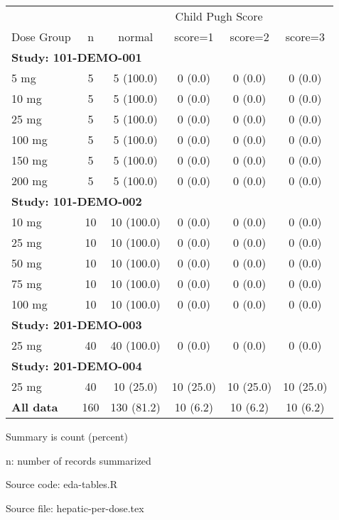 \setlength{\tabcolsep}{5pt} 
\begin{threeparttable}
\renewcommand{\arraystretch}{1.3}
\begin{tabular}[h]{lccccc}
\hline
\multicolumn{2}{c}{} & \multicolumn{4}{c}{Child Pugh Score} \\
\cmidrule(lr){3-6}
Dose Group & n & normal & score=1 & score=2 & score=3 \\
\hline
\multicolumn{6}{l}{\textbf{Study: 101-DEMO-001}}\\%
5 mg & 5 & 5 (100.0) & 0 (0.0) & 0 (0.0) & 0 (0.0) \\
10 mg & 5 & 5 (100.0) & 0 (0.0) & 0 (0.0) & 0 (0.0) \\
25 mg & 5 & 5 (100.0) & 0 (0.0) & 0 (0.0) & 0 (0.0) \\
100 mg & 5 & 5 (100.0) & 0 (0.0) & 0 (0.0) & 0 (0.0) \\
150 mg & 5 & 5 (100.0) & 0 (0.0) & 0 (0.0) & 0 (0.0) \\
200 mg & 5 & 5 (100.0) & 0 (0.0) & 0 (0.0) & 0 (0.0) \\
\hline \multicolumn{6}{l}{\textbf{Study: 101-DEMO-002}}\\%
10 mg & 10 & 10 (100.0) & 0 (0.0) & 0 (0.0) & 0 (0.0) \\
25 mg & 10 & 10 (100.0) & 0 (0.0) & 0 (0.0) & 0 (0.0) \\
50 mg & 10 & 10 (100.0) & 0 (0.0) & 0 (0.0) & 0 (0.0) \\
75 mg & 10 & 10 (100.0) & 0 (0.0) & 0 (0.0) & 0 (0.0) \\
100 mg & 10 & 10 (100.0) & 0 (0.0) & 0 (0.0) & 0 (0.0) \\
\hline \multicolumn{6}{l}{\textbf{Study: 201-DEMO-003}}\\%
25 mg & 40 & 40 (100.0) & 0 (0.0) & 0 (0.0) & 0 (0.0) \\
\hline \multicolumn{6}{l}{\textbf{Study: 201-DEMO-004}}\\%
25 mg & 40 & 10 (25.0) & 10 (25.0) & 10 (25.0) & 10 (25.0) \\
\hline \hline {\bf All data} & 160 & 130 (81.2) & 10 (6.2) & 10 (6.2) & 10 (6.2) \\
\hline
\end{tabular}
\begin{tablenotes}[flushleft]
\item Summary is count (percent)
\item n: number of records summarized
\item Source code: eda-tables.R
\item Source file: hepatic-per-dose.tex
\end{tablenotes}
\end{threeparttable}
